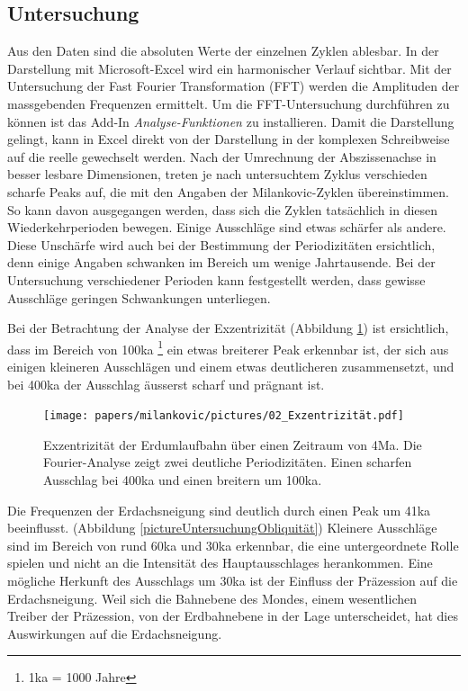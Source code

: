 \subsection{Untersuchung
\label{milankovic:subsection:Untersuchung}}
Aus den Daten sind die absoluten Werte der einzelnen Zyklen ablesbar.
In der Darstellung mit Microsoft-Excel wird ein harmonischer Verlauf sichtbar.
Mit der Untersuchung der Fast Fourier Transformation (FFT) werden die Amplituden der massgebenden Frequenzen ermittelt.
Um die FFT-Untersuchung durchführen zu können ist das Add-In
{\em Analyse-Funktionen}
zu installieren.
Damit die Darstellung gelingt, kann in Excel direkt von der Darstellung in der komplexen Schreibweise auf die reelle gewechselt werden.
Nach der Umrechnung der Abszissenachse in besser lesbare Dimensionen, treten je nach untersuchtem Zyklus verschieden scharfe Peaks auf, die mit den Angaben der Milankovic-Zyklen übereinstimmen.
So kann davon ausgegangen werden, dass sich die Zyklen tatsächlich in diesen Wiederkehrperioden bewegen.
Einige Ausschläge sind etwas schärfer als andere.
Diese Unschärfe wird auch bei der Bestimmung der Periodizitäten ersichtlich, denn einige Angaben schwanken im Bereich um wenige Jahrtausende.
Bei der Untersuchung verschiedener Perioden kann festgestellt werden, dass gewisse Ausschläge geringen Schwankungen unterliegen.

Bei der Betrachtung der Analyse der Exzentrizität
(Abbildung \ref{pictureUntersuchungExzentrizität})
ist ersichtlich, dass im Bereich von 100ka
\footnote{1ka = 1000 Jahre}
ein etwas breiterer Peak erkennbar ist, der sich aus einigen kleineren Ausschlägen und einem etwas deutlicheren zusammensetzt, und bei 400ka der Ausschlag äusserst scharf und prägnant ist.

\begin{figure}
	\centering
	\texttt{[image: papers/milankovic/pictures/02\_Exzentrizität.pdf]}
	\caption{Exzentrizität der Erdumlaufbahn über einen Zeitraum von 4Ma.
	Die Fourier-Analyse zeigt zwei deutliche Periodizitäten. 
	Einen scharfen Ausschlag bei 400ka und einen breitern um 100ka.
	\label{pictureUntersuchungExzentrizität}}
\end{figure}

Die Frequenzen der Erdachsneigung sind deutlich durch einen Peak um 41ka beeinflusst.
	(Abbildung \ref{pictureUntersuchungObliquität})
Kleinere Ausschläge sind im Bereich von rund 60ka und 30ka erkennbar, die eine untergeordnete Rolle spielen und nicht an die Intensität des Hauptausschlages herankommen.
Eine mögliche Herkunft des Ausschlags um 30ka ist der Einfluss der Präzession auf die Erdachsneigung. 
Weil sich die Bahnebene des Mondes, einem wesentlichen Treiber der Präzession, von der Erdbahnebene in der Lage unterscheidet, hat dies Auswirkungen auf die Erdachsneigung.

